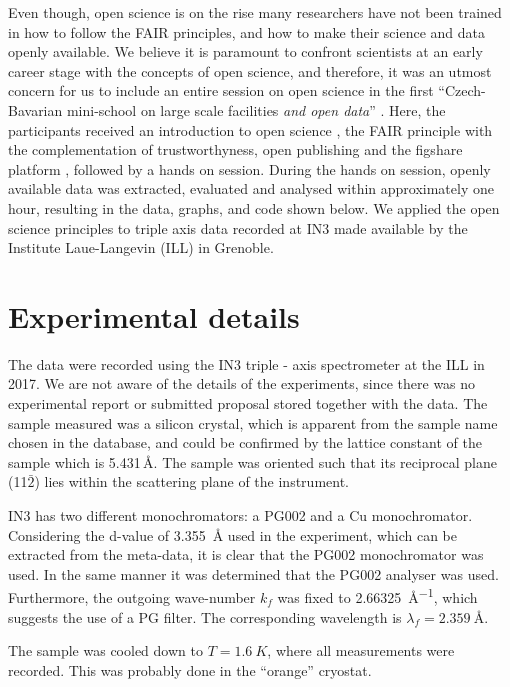\documentclass[aps,pra,reprint,amsmath,amssymb,superscriptaddress,showkeys]{revtex4-1}
\begin{document}
Even though, open science is on the rise many researchers have not been trained in how to follow the FAIR principles, and how to make their science and data openly available.
We believe it is paramount to confront scientists at an early career stage with the concepts of open science, and therefore, it was an utmost concern for us to include an entire session on open science in the first ``Czech-Bavarian mini-school on large scale facilities \emph{and open data}'' \cite{mini-school}.
Here, the participants received an introduction to open science \cite{foster}, the FAIR principle \cite{FAIR} with the complementation of trustworthyness, open publishing \cite{arXiv} and the figshare platform \cite{figshare}, followed by a hands on session.
During the hands on session, openly available data was extracted, evaluated and analysed within approximately one hour, resulting in the data, graphs, and code \cite{data-evaluation, data-docker} shown below.
We applied the open science principles to triple axis data recorded at IN3 \cite{data} made available by the Institute Laue-Langevin (ILL) in Grenoble.

\section{Experimental details}

The data were recorded using the IN3 triple - axis spectrometer \cite{IN3} at the ILL in 2017.
We are not aware of the details of the experiments, since there was no experimental report or submitted proposal stored together with the data.
The sample measured was a silicon crystal, which is apparent from the sample name chosen in the database, and could be confirmed by the lattice constant of the sample which is 5.431\,\AA \cite{Hom1975}. The sample was oriented such that its reciprocal plane (11$\bar{2}$) lies within the scattering plane of the instrument.

IN3 has two different monochromators: a PG002 and a Cu monochromator.
Considering the d-value of \SI{3.355}{\mbox{\AA}} used in the experiment, which can be extracted from the meta-data, it is clear that the PG002 monochromator was used.
In the same manner it was determined that the PG002 analyser was used. 
Furthermore, the outgoing wave-number $k_f$ was fixed to \SI{2.66325}{\mbox{\AA}^{-1}}, which suggests the use of a PG filter. 
The corresponding wavelength is $\lambda_f=\SI{2.359}{\mbox{\AA}}$.

The sample was cooled down to $T = \SI{1.6}{K}$, where all measurements were recorded. 
This was probably done in the ``orange'' cryostat.
\end{document}
